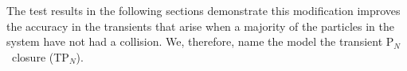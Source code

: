 \documentclass[review]{elsarticle}
\newcommand{\pn}{P$_N$}
\newcommand{\tp}[1]{TP$_{#1}$}
\newcommand{\psii}[1]{\phi_\ensuremath{{#1}}}
\begin{document}

The test results in the following sections demonstrate this modification improves the accuracy in the transients that arise when a majority of the particles in the system have not had a collision. We, therefore, name the model the transient \pn\ closure (\tp{N}).
\end{document}
